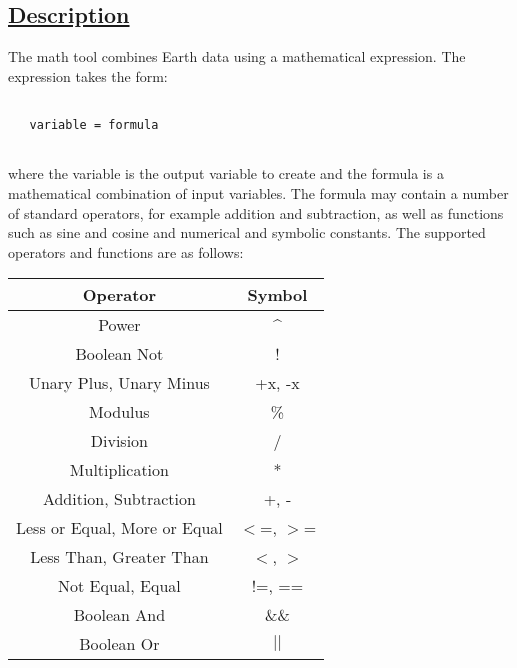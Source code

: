 \subsection*{\underline{Description}}


  The math tool combines Earth data using a mathematical expression. The expression takes the form: \begin{verbatim}

   variable = formula
 
\end{verbatim}
 where the variable is the output variable to create and the formula is a mathematical combination of input variables. The formula may contain a number of standard operators, for example addition and subtraction, as well as functions such as sine and cosine and numerical and symbolic constants. The supported operators and functions are as follows:


 

\begin{tabular}{|c|c|}
\hline 
Operator &Symbol \\
 \hline 
Power &\^{} \\
 \hline 
Boolean Not &! \\
 \hline 
Unary Plus, Unary Minus &+x, -x \\
 \hline 
Modulus &\% \\
 \hline 
Division &/ \\
 \hline 
Multiplication &* \\
 \hline 
Addition, Subtraction &+, - \\
 \hline 
Less or Equal, More or Equal &$<$=, $>$= \\
 \hline 
Less Than, Greater Than &$<$, $>$ \\
 \hline 
Not Equal, Equal &!=, == \\
 \hline 
Boolean And &\&\& \\
 \hline 
Boolean Or &$|$$|$ \\
 \hline 

\end{tabular}




 

